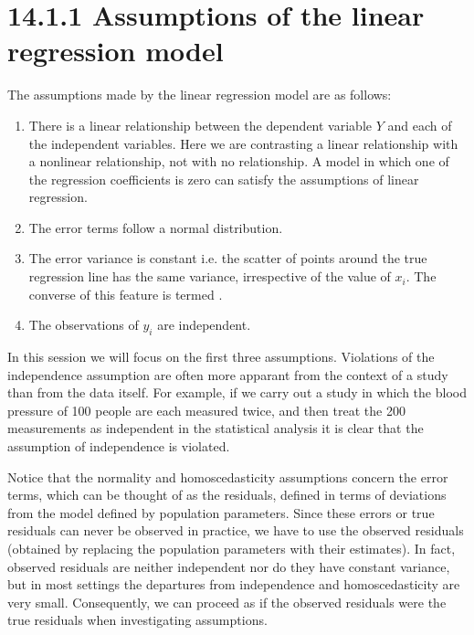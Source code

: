 \documentclass[letterpaper,10pt,english]{jupyterBook}
\begin{document}
\section{14.1.1 Assumptions of the linear regression model}
\label{\detokenize{14.b. Linear Regression III:assumptions-of-the-linear-regression-model}}
\sphinxAtStartPar
The assumptions made by the linear regression model are as follows:
\begin{enumerate}
%
\item {} 
\sphinxAtStartPar
{} There is a linear relationship between the dependent variable \(Y\) and each of the independent variables. Here we are contrasting a linear relationship with a non\sphinxhyphen{}linear relationship, not with no relationship. A model in which one of the regression coefficients is zero can satisfy the assumptions of linear regression.

\item {} 
\sphinxAtStartPar
{} The error terms follow a normal distribution.

\item {} 
\sphinxAtStartPar
{} The error variance is constant i.e. the scatter of points around the true regression line has the same variance, irrespective of the value of \(x_i\). The converse of this feature is termed .

\item {} 
\sphinxAtStartPar
{} The observations of \(y_i\) are independent.

\end{enumerate}

\sphinxAtStartPar
In this session we will focus on the first three assumptions. Violations of the independence assumption are often more apparant from the context of a study than from the data itself. For example, if we carry out a study in which the blood pressure of 100 people are each measured twice, and then treat the 200 measurements as independent in the statistical analysis it is clear that the assumption of independence is violated.

\sphinxAtStartPar
Notice that the normality and homoscedasticity assumptions concern the error terms, which can be thought of as the  residuals, defined in terms of deviations from the model defined by population parameters. Since these errors or true residuals can never be observed in practice, we have to use the observed residuals (obtained by replacing the population parameters with their estimates). In fact, observed residuals are neither independent nor do they have constant variance, but in most settings the departures from independence and homoscedasticity are very small. Consequently, we can proceed as if the observed residuals were the true residuals when investigating assumptions.
\end{document}
